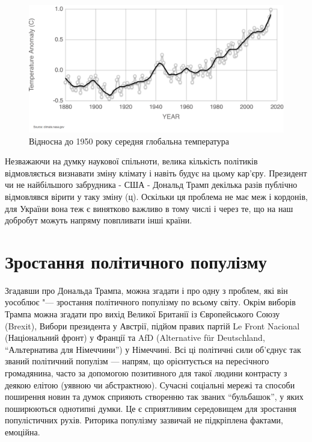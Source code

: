         \begin{figure}[!htp]
            \centering
            \includegraphics[scale = 0.4]{PNG/GlobalTemp.png}
            \caption{Відносна до 1950 року середня глобальна температура}
            \label{fig:globaltemp}
        \end{figure}

        Незважаючи на думку наукової спільноти, велика кількість політиків відмовляється визнавати зміну клімату і навіть будує на цьому
        кар'єру. Президент чи не найбільшого забрудника - США - Дональд Трамп декілька разів публічно відмовлявся вірити у таку зміну (ц).
        Оскільки ця проблема не має меж і кордонів, для України вона теж є винятково важливо в тому числі і через те, що на наш добробут
        можуть напряму повпливати інші країни.

    \section{Зростання політичного популізму}

        Згадавши про Дональда Трампа, можна згадати і про одну з проблем, які він уособлює "--- зростання політичного популізму 
        по всьому світу. Окрім виборів Трампа можна згадати про вихід Великої Британії із Європейського Союзу (Brexit),
        Вибори президента у Австрії, підйом правих партій Le Front Nacional (Національний фронт) у Франції та AfD 
        (Alternative für Deutschland, ``Альтернатива для Німеччини'') у Німеччині. Всі ці політичні сили об'єднує 
        так званий політичний популізм --- напрям, що орієнтується на пересічного громадянина, часто за допомогою 
        позитивного для такої людини контрасту з деякою елітою (уявною чи абстрактною). Сучасні соціальні мережі 
        та способи поширення новин та думок сприяють створенню так званих ``бульбашок'', у яких поширюються однотипні
        думки. Це є сприятливим середовищем для зростання популістичних рухів. Риторика популізму зазвичай не підкріплена
        фактами, емоційна.

